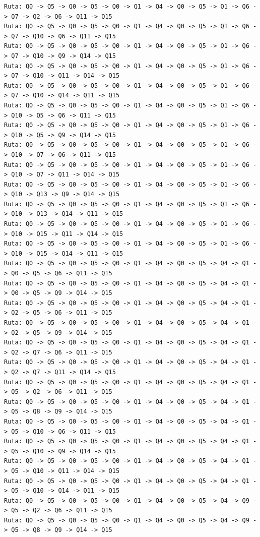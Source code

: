 \documentclass{article}
\begin{document}
\begin{lstlisting}[language={},basicstyle=\ttfamily\footnotesize, breaklines=true]
Ruta: Q0 -> Q5 -> Q0 -> Q5 -> Q0 -> Q1 -> Q4 -> Q0 -> Q5 -> Q1 -> Q6 -> Q7 -> Q2 -> Q6 -> Q11 -> Q15
Ruta: Q0 -> Q5 -> Q0 -> Q5 -> Q0 -> Q1 -> Q4 -> Q0 -> Q5 -> Q1 -> Q6 -> Q7 -> Q10 -> Q6 -> Q11 -> Q15
Ruta: Q0 -> Q5 -> Q0 -> Q5 -> Q0 -> Q1 -> Q4 -> Q0 -> Q5 -> Q1 -> Q6 -> Q7 -> Q10 -> Q9 -> Q14 -> Q15
Ruta: Q0 -> Q5 -> Q0 -> Q5 -> Q0 -> Q1 -> Q4 -> Q0 -> Q5 -> Q1 -> Q6 -> Q7 -> Q10 -> Q11 -> Q14 -> Q15
Ruta: Q0 -> Q5 -> Q0 -> Q5 -> Q0 -> Q1 -> Q4 -> Q0 -> Q5 -> Q1 -> Q6 -> Q7 -> Q10 -> Q14 -> Q11 -> Q15
Ruta: Q0 -> Q5 -> Q0 -> Q5 -> Q0 -> Q1 -> Q4 -> Q0 -> Q5 -> Q1 -> Q6 -> Q10 -> Q5 -> Q6 -> Q11 -> Q15
Ruta: Q0 -> Q5 -> Q0 -> Q5 -> Q0 -> Q1 -> Q4 -> Q0 -> Q5 -> Q1 -> Q6 -> Q10 -> Q5 -> Q9 -> Q14 -> Q15
Ruta: Q0 -> Q5 -> Q0 -> Q5 -> Q0 -> Q1 -> Q4 -> Q0 -> Q5 -> Q1 -> Q6 -> Q10 -> Q7 -> Q6 -> Q11 -> Q15
Ruta: Q0 -> Q5 -> Q0 -> Q5 -> Q0 -> Q1 -> Q4 -> Q0 -> Q5 -> Q1 -> Q6 -> Q10 -> Q7 -> Q11 -> Q14 -> Q15
Ruta: Q0 -> Q5 -> Q0 -> Q5 -> Q0 -> Q1 -> Q4 -> Q0 -> Q5 -> Q1 -> Q6 -> Q10 -> Q13 -> Q9 -> Q14 -> Q15
Ruta: Q0 -> Q5 -> Q0 -> Q5 -> Q0 -> Q1 -> Q4 -> Q0 -> Q5 -> Q1 -> Q6 -> Q10 -> Q13 -> Q14 -> Q11 -> Q15
Ruta: Q0 -> Q5 -> Q0 -> Q5 -> Q0 -> Q1 -> Q4 -> Q0 -> Q5 -> Q1 -> Q6 -> Q10 -> Q15 -> Q11 -> Q14 -> Q15
Ruta: Q0 -> Q5 -> Q0 -> Q5 -> Q0 -> Q1 -> Q4 -> Q0 -> Q5 -> Q1 -> Q6 -> Q10 -> Q15 -> Q14 -> Q11 -> Q15
Ruta: Q0 -> Q5 -> Q0 -> Q5 -> Q0 -> Q1 -> Q4 -> Q0 -> Q5 -> Q4 -> Q1 -> Q0 -> Q5 -> Q6 -> Q11 -> Q15
Ruta: Q0 -> Q5 -> Q0 -> Q5 -> Q0 -> Q1 -> Q4 -> Q0 -> Q5 -> Q4 -> Q1 -> Q0 -> Q5 -> Q9 -> Q14 -> Q15
Ruta: Q0 -> Q5 -> Q0 -> Q5 -> Q0 -> Q1 -> Q4 -> Q0 -> Q5 -> Q4 -> Q1 -> Q2 -> Q5 -> Q6 -> Q11 -> Q15
Ruta: Q0 -> Q5 -> Q0 -> Q5 -> Q0 -> Q1 -> Q4 -> Q0 -> Q5 -> Q4 -> Q1 -> Q2 -> Q5 -> Q9 -> Q14 -> Q15
Ruta: Q0 -> Q5 -> Q0 -> Q5 -> Q0 -> Q1 -> Q4 -> Q0 -> Q5 -> Q4 -> Q1 -> Q2 -> Q7 -> Q6 -> Q11 -> Q15
Ruta: Q0 -> Q5 -> Q0 -> Q5 -> Q0 -> Q1 -> Q4 -> Q0 -> Q5 -> Q4 -> Q1 -> Q2 -> Q7 -> Q11 -> Q14 -> Q15
Ruta: Q0 -> Q5 -> Q0 -> Q5 -> Q0 -> Q1 -> Q4 -> Q0 -> Q5 -> Q4 -> Q1 -> Q5 -> Q2 -> Q6 -> Q11 -> Q15
Ruta: Q0 -> Q5 -> Q0 -> Q5 -> Q0 -> Q1 -> Q4 -> Q0 -> Q5 -> Q4 -> Q1 -> Q5 -> Q8 -> Q9 -> Q14 -> Q15
Ruta: Q0 -> Q5 -> Q0 -> Q5 -> Q0 -> Q1 -> Q4 -> Q0 -> Q5 -> Q4 -> Q1 -> Q5 -> Q10 -> Q6 -> Q11 -> Q15
Ruta: Q0 -> Q5 -> Q0 -> Q5 -> Q0 -> Q1 -> Q4 -> Q0 -> Q5 -> Q4 -> Q1 -> Q5 -> Q10 -> Q9 -> Q14 -> Q15
Ruta: Q0 -> Q5 -> Q0 -> Q5 -> Q0 -> Q1 -> Q4 -> Q0 -> Q5 -> Q4 -> Q1 -> Q5 -> Q10 -> Q11 -> Q14 -> Q15
Ruta: Q0 -> Q5 -> Q0 -> Q5 -> Q0 -> Q1 -> Q4 -> Q0 -> Q5 -> Q4 -> Q1 -> Q5 -> Q10 -> Q14 -> Q11 -> Q15
Ruta: Q0 -> Q5 -> Q0 -> Q5 -> Q0 -> Q1 -> Q4 -> Q0 -> Q5 -> Q4 -> Q9 -> Q5 -> Q2 -> Q6 -> Q11 -> Q15
Ruta: Q0 -> Q5 -> Q0 -> Q5 -> Q0 -> Q1 -> Q4 -> Q0 -> Q5 -> Q4 -> Q9 -> Q5 -> Q8 -> Q9 -> Q14 -> Q15
    \end{lstlisting}
\end{document}
